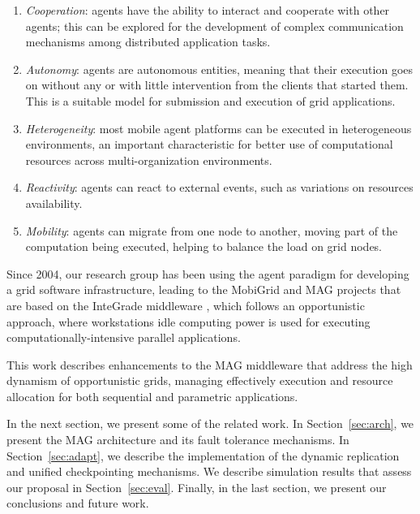 \documentclass{sig-alternate}
\begin{document}
\begin{enumerate}
    \item \emph{Cooperation}: agents have the ability to interact and cooperate
    with other agents; this can be explored for the development of complex
    communication mechanisms among distributed application tasks.
   
    \item \emph{Autonomy}: agents are autonomous entities, meaning that their
    execution goes on without any or with little intervention from the clients
    that started them. This is a suitable model for submission and execution
    of grid applications.
  
    \item \emph{Heterogeneity}: most mobile agent platforms can be executed
    in heterogeneous environments, an important characteristic for better use
    of computational resources across multi-organization environments.
  
    \item \emph{Reactivity}: agents can react to external events, such as
    variations on resources availability.
  
    \item \emph{Mobility}: agents can migrate from one node to another,
    moving part of the computation being executed, helping to balance the load on grid nodes.
\end{enumerate}

Since 2004, our research group has been using the agent paradigm
for developing a grid software infrastructure, leading to the MobiGrid \cite{barbosa04} and MAG \cite{lopes05}
projects  that are based on the
InteGrade middleware \cite{goldchleger04}, which follows an opportunistic approach, where
workstations idle computing power is used for executing
computationally-intensive parallel applications.

This work describes enhancements to the MAG middleware that
address the high dynamism of opportunistic
grids, managing effectively execution and resource allocation for both sequential and
parametric applications. 

In the next section, we present some of the related work. In
Section~\ref{sec:arch}, we present the MAG architecture and its fault tolerance
mechanisms. In Section~\ref{sec:adapt}, we describe the implementation
of the dynamic replication and unified checkpointing mechanisms. We describe
simulation results that assess our proposal in Section~\ref{sec:eval}.
Finally, in the last section, we present our conclusions and future work.
\end{document}
